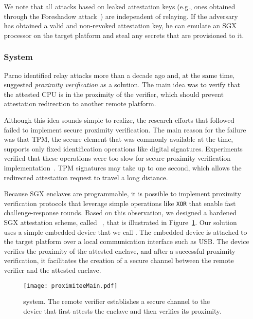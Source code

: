 We note that all attacks based on leaked attestation keys (e.g., ones obtained through the Foreshadow attack~\cite{van2018foreshadow}) are independent of relaying. If the adversary has obtained a valid and non-revoked attestation key, he can emulate an SGX processor on the target platform and steal any secrets that are provisioned to it.


\subsubsection*{\proximitee System}

Parno identified relay attacks more than a decade ago and, at the same time, suggested \emph{proximity verification} as a solution. The main idea was to verify that the attested CPU is in the proximity of the verifier, which should prevent attestation redirection to another remote platform. 

Although this idea sounds simple to realize, the research efforts that followed failed to implement secure proximity verification. The main reason for the failure was that TPM, the secure element that was commonly available at the time, supports only fixed identification operations like digital signatures. Experiments verified that these operations were too slow for secure proximity verification implementation~\cite{CatchingCuckoo}. TPM signatures may take up to one second, which allows the redirected attestation request to travel a long distance.

Because SGX enclaves are programmable, it is possible to implement proximity verification protocols that leverage simple operations like \texttt{XOR} that enable fast challenge-response rounds. Based on this observation, we designed a hardened SGX attestation scheme, called \proximitee~\cite{proximitee}, that is illustrated in Figure~\ref{fig:proximitee}. Our solution uses a simple embedded device that we call \key. The embedded device is attached to the target platform over a local communication interface such as USB. The \key device verifies the proximity of the attested enclave, and after a successful proximity verification, it facilitates the creation of a secure channel between the remote verifier and the attested enclave. 

\begin{figure}[t]
 \centering
  \texttt{[image: proximiteeMain.pdf]}
 \caption{\proximitee system. The remote verifier establishes a secure channel to the \key device that first attests the enclave and then verifies its proximity.}
 \label{fig:proximitee}
\end{figure}

